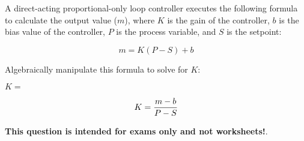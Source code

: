 

A direct-acting proportional-only loop controller executes the following formula to calculate the output value ($m$), where $K$ is the gain of the controller, $b$ is the bias value of the controller, $P$ is the process variable, and $S$ is the setpoint:

$$m = K(P - S) + b$$

Algebraically manipulate this formula to solve for $K$:

\vskip 20pt

$K = $







$$K = {m - b \over P - S}$$







{\bf This question is intended for exams only and not worksheets!}.



